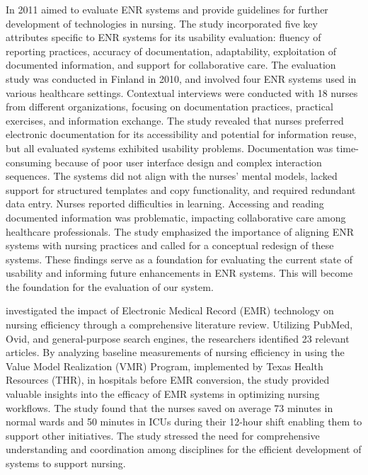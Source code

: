 In 2011 \cite{enr-usability} aimed to evaluate ENR systems and provide guidelines for further development of technologies in nursing. The study incorporated five key attributes specific to ENR systems for its usability evaluation: fluency of reporting practices, accuracy of documentation, adaptability, exploitation of documented information, and support for collaborative care.
The evaluation study was conducted in Finland in 2010, and involved four ENR systems used in various healthcare settings. Contextual interviews were conducted with 18 nurses from different organizations, focusing on documentation practices, practical exercises, and information exchange.
The study revealed that nurses preferred electronic documentation for its accessibility and potential for information reuse, but all evaluated systems exhibited usability problems. Documentation was time-consuming because of poor user interface design and complex interaction sequences. The systems did not align with the nurses' mental models, lacked support for structured templates and copy functionality, and required redundant data entry. Nurses reported difficulties in learning. Accessing and reading documented information was problematic, impacting collaborative care among healthcare professionals. 
The study emphasized the importance of aligning ENR systems with nursing practices and called for a conceptual redesign of these systems. These findings serve as a foundation for evaluating the current state of usability and informing future enhancements in ENR systems. This will become the foundation for the evaluation of our system.

\cite{emr-impact} investigated the impact of Electronic Medical Record (EMR) technology on nursing efficiency through a comprehensive literature review. Utilizing PubMed, Ovid, and general-purpose search engines, the researchers identified 23 relevant articles. By analyzing baseline measurements of nursing efficiency in using the Value Model Realization (VMR) Program, implemented by Texas Health Resources (THR), in hospitals before EMR conversion, the study provided valuable insights into the efficacy of EMR systems in optimizing nursing workflows. The study found that the nurses saved on average 73 minutes in normal wards and 50 minutes in ICUs during their 12-hour shift enabling them to support other initiatives. The study stressed the need for comprehensive understanding and coordination among disciplines for the efficient development of systems to support nursing. 

